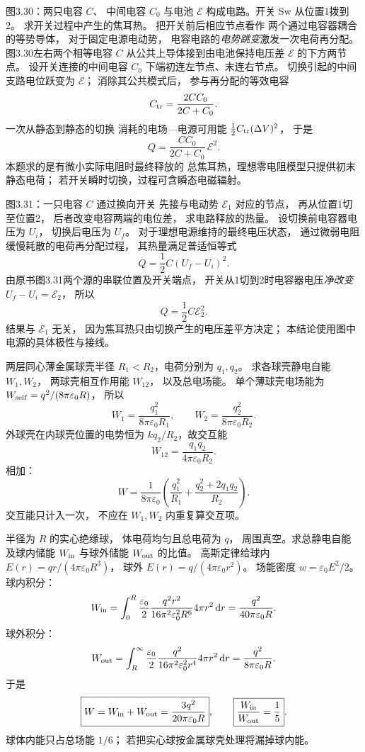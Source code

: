 图3.30：两只电容 $C$、
中间电容 $C_0$ 与电池 $\mathcal E$
构成电路。开关 Sw 从位置1拨到2。
求开关过程中产生的焦耳热。
\exsolution
把开关前后相应节点看作
两个通过电容器耦合的等势导体，
对于固定电源电动势，
电容电路的\emph{电势跳变}激发一次电荷再分配。
图3.30左右两个相等电容 $C$
从公共上导体接到由电池保持电压差
$\mathcal E$ 的下方两节点。
设开关连接的中间电容 $C_0$
下端初连左节点、末连右节点。
切换引起的中间支路电位跃变为 $\mathcal E$；
消除其公共模式后，
参与再分配的等效电容
\[
C_{\rm tr}=\frac{2CC_0}{2C+C_0}.
\]
一次从静态到静态的切换
消耗的电场—电源可用能
$\frac12C_{\rm tr}(\Delta V)^2$，
于是
\[
\boxed{Q=\frac{CC_0}{2C+C_0}\,\mathcal E^2}.
\]
\excheck 本题求的是有微小实际电阻时最终释放的
总焦耳热，理想零电阻模型只提供初末静态电荷；
若开关瞬时切换，过程可含瞬态电磁辐射。

图3.31：一只电容 $C$ 通过换向开关
先接与电动势 $\mathcal E_1$ 对应的节点，
再从位置1切至位置2，
后者改变电容两端的电位差，
求电路释放的热量。
\exsolution
设切换前电容器电压为 $U_i$，
切换后电压为 $U_f$。
对于理想电源维持的最终电压状态，
通过微弱电阻缓慢耗散的电荷再分配过程，
其热量满足普适恒等式
\[
Q=\frac12C(U_f-U_i)^2.
\]
由原书图3.31两个源的串联位置及开关端点，
开关从1切到2时电容器电压\emph{净改变}
$U_f-U_i=\mathcal E_2$，
所以
\[
\boxed{Q=\frac12C\mathcal E_2^2}.
\]
\excheck 结果与 $\mathcal E_1$ 无关，
因为焦耳热只由切换产生的电压差平方决定；
本结论使用图中电源的具体极性与接线。

两层同心薄金属球壳半径
$R_1<R_2$，电荷分别为 $q_1,q_2$。
求各球壳静电自能 $W_1,W_2$，
两球壳相互作用能 $W_{12}$，
以及总电场能。
\exsolution
单个薄球壳电场能为
$W_{\rm self}=q^2/(8\pi\varepsilon_0R)$，
所以
\[
\boxed{W_1=\frac{q_1^2}{8\pi\varepsilon_0R_1}},
\qquad
\boxed{W_2=\frac{q_2^2}{8\pi\varepsilon_0R_2}}.
\]
外球壳在内球壳位置的电势恒为
$kq_2/R_2$，故交互能
\[
\boxed{W_{12}=\frac{q_1q_2}{4\pi\varepsilon_0R_2}}.
\]
相加：
\[
\boxed{W=
\frac1{8\pi\varepsilon_0}
\left(\frac{q_1^2}{R_1}+
\frac{q_2^2+2q_1q_2}{R_2}\right)}.
\]
\excheck 交互能只计入一次，
不应在 $W_1,W_2$ 内重复算交互项。

半径为 $R$ 的实心绝缘球，
体电荷均匀且总电荷为 $q$，
周围真空。求总静电自能
及球内储能 $W_{\rm in}$ 与球外储能
$W_{\rm out}$ 的比值。
\exsolution
高斯定律给球内
$E(r)=qr/(4\pi\varepsilon_0R^3)$，
球外
$E(r)=q/(4\pi\varepsilon_0r^2)$。
场能密度
$w=\varepsilon_0E^2/2$。
球内积分：
\[
W_{\rm in}=\int_0^R
\frac{\varepsilon_0}{2}
\frac{q^2r^2}{16\pi^2\varepsilon_0^2R^6}
4\pi r^2\,\mathrm dr
=\frac{q^2}{40\pi\varepsilon_0R}.
\]
球外积分：
\[
W_{\rm out}=\int_R^\infty
\frac{\varepsilon_0}{2}
\frac{q^2}{16\pi^2\varepsilon_0^2r^4}
4\pi r^2\,\mathrm dr
=\frac{q^2}{8\pi\varepsilon_0R}.
\]
于是
\[
\boxed{W=W_{\rm in}+W_{\rm out}
=\frac{3q^2}{20\pi\varepsilon_0R}},
\qquad
\boxed{\frac{W_{\rm in}}{W_{\rm out}}=\frac15}.
\]
\excheck 球体内能只占总场能 $1/6$；
若把实心球按金属球壳处理将漏掉球内能。

